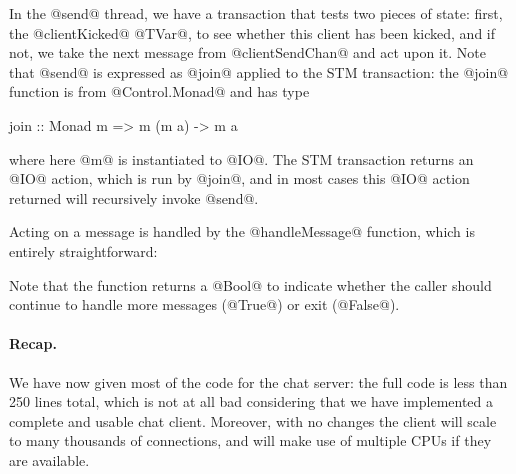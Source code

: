 In the @send@ thread, we have a transaction that tests two pieces of
state: first, the @clientKicked@ @TVar@, to see whether this client
has been kicked, and if not, we take the next message from
@clientSendChan@ and act upon it.  Note that @send@ is expressed as
@join@ applied to the STM transaction: the @join@ function is from
@Control.Monad@ and has type

\begin{haskell}
join :: Monad m => m (m a) -> m a
\end{haskell}

\noindent where here @m@ is instantiated to @IO@.  The STM transaction
returns an @IO@ action, which is run by @join@, and in most cases this
@IO@ action returned will recursively invoke @send@.

Acting on a message is handled by the @handleMessage@ function, which
is entirely straightforward:


Note that the function returns a @Bool@ to indicate whether the caller
should continue to handle more messages (@True@) or exit (@False@).

\paragraph{Recap.}  We have now given most of the code for the chat
server: the full code is less than 250
lines total, which is not at all bad considering that we have
implemented a complete and usable chat client.  Moreover, with no
changes the client will scale to many thousands of connections, and
will make use of multiple CPUs if they are available.

